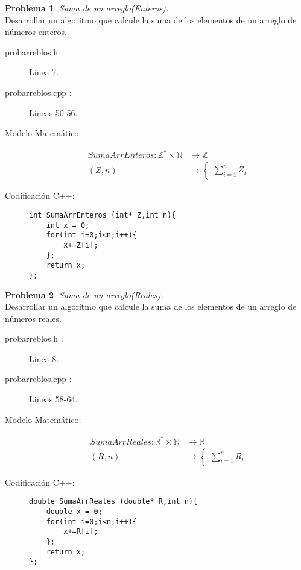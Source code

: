 \documentclass{article}
\theoremstyle{plain}
\theoremstyle{definition}
\newtheorem{problem}{Problema}
\begin{document}
\begin{problem} \emph{Suma de un arreglo(Enteros).}\\
\hspace*{7mm}Desarrollar un algoritmo que calcule la suma de los elementos de un arreglo de números enteros.
\begin{description}
\item[probarreblos.h :] Linea 7. \item[probarreblos.cpp :] Lineas 50-56.

\item[Modelo Matemático:]
\begin{align*}
SumaArrEnteros: \mathbb{Z}^{*}\times\mathbb{N} &\to \mathbb{Z}\\
(Z,n) &\mapsto
\begin{cases}
\sum_{i=1}^{n}Z_{i}
\end{cases}
\end{align*}
%
\item[Codificación \textsf{C++}:]\hfill
%
\begin{verbatim}
int SumaArrEnteros (int* Z,int n){
    int x = 0;
    for(int i=0;i<n;i++){
        x+=Z[i];
    };
    return x;
};
\end{verbatim}
\end{description}
\end{problem}

\begin{problem} \emph{Suma de un arreglo(Reales).}\\
\hspace*{7mm}Desarrollar un algoritmo que calcule la suma de los elementos de un arreglo de números reales.
\begin{description}
\item[probarreblos.h :] Linea 8. \item[probarreblos.cpp :] Lineas 58-64.

\item[Modelo Matemático:]
\begin{align*}
SumaArrReales: \mathbb{R}^{*}\times\mathbb{N} &\to \mathbb{R}\\
(R,n) &\mapsto
\begin{cases}
\sum_{i=1}^{n}R_{i}
\end{cases}
\end{align*}
%
\item[Codificación \textsf{C++}:]\hfill
%
\begin{verbatim}
double SumaArrReales (double* R,int n){
    double x = 0;
    for(int i=0;i<n;i++){
        x+=R[i];
    };
    return x;
};
\end{verbatim}
\end{description}
\end{problem}
\end{document}
